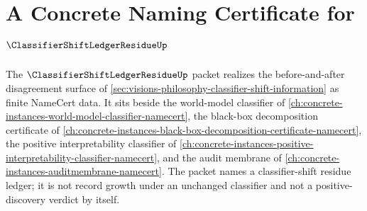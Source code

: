 \chapter{A Concrete Naming Certificate for $\ClassifierShiftLedgerResidueUp$}
\label{ch:concrete-instances-classifier-shift-ledger-residue-namecert}

The $\ClassifierShiftLedgerResidueUp$ packet realizes the before-and-after disagreement surface of \autoref{sec:visions-philosophy-classifier-shift-information} as finite NameCert data. It sits beside the world-model classifier of \autoref{ch:concrete-instances-world-model-classifier-namecert}, the black-box decomposition certificate of \autoref{ch:concrete-instances-black-box-decomposition-certificate-namecert}, the positive interpretability classifier of \autoref{ch:concrete-instances-positive-interpretability-classifier-namecert}, and the audit membrane of \autoref{ch:concrete-instances-auditmembrane-namecert}. The packet names a classifier-shift residue ledger; it is not record growth under an unchanged classifier and not a positive-discovery verdict by itself.

